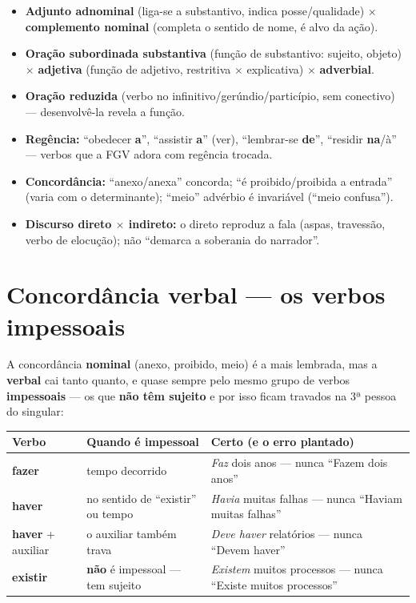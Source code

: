\begin{itemize}
\item \textbf{Adjunto adnominal} (liga-se a substantivo, indica
posse/qualidade) $\times$ \textbf{complemento nominal} (completa o sentido
de nome, é alvo da ação).
\item \textbf{Oração subordinada substantiva} (função de substantivo:
sujeito, objeto) $\times$ \textbf{adjetiva} (função de adjetivo, restritiva
$\times$ explicativa) $\times$ \textbf{adverbial}.
\item \textbf{Oração reduzida} (verbo no infinitivo/gerúndio/particípio, sem
conectivo) --- desenvolvê-la revela a função.
\item \textbf{Regência:} ``obedecer \textbf{a}'', ``assistir \textbf{a}''
(ver), ``lembrar-se \textbf{de}'', ``residir \textbf{na}/à'' --- verbos que a
FGV adora com regência trocada.
\item \textbf{Concordância:} ``anexo/anexa'' concorda; ``é
proibido/proibida a entrada'' (varia com o determinante); ``meio'' advérbio é
invariável (``meio confusa'').
\item \textbf{Discurso direto $\times$ indireto:} o direto reproduz a fala
(aspas, travessão, verbo de elocução); não ``demarca a soberania do
narrador''.
\end{itemize}

\section{Concordância verbal --- os verbos impessoais}

A concordância \textbf{nominal} (anexo, proibido, meio) é a mais lembrada,
mas a \textbf{verbal} cai tanto quanto, e quase sempre pelo mesmo grupo de
verbos \textbf{impessoais} --- os que \textbf{não têm sujeito} e por isso
ficam travados na 3ª pessoa do singular:

\begin{center}
\begin{tabular}{@{}p{3.2cm}p{3.4cm}p{4.4cm}@{}}
\toprule
\textbf{Verbo} & \textbf{Quando é impessoal} & \textbf{Certo (e o erro plantado)} \\
\midrule
\textbf{fazer} & tempo decorrido & \emph{Faz} dois anos --- nunca ``Fazem dois anos'' \\
\textbf{haver} & no sentido de ``existir'' ou tempo & \emph{Havia} muitas falhas --- nunca ``Haviam muitas falhas'' \\
\textbf{haver} + auxiliar & o auxiliar também trava & \emph{Deve haver} relatórios --- nunca ``Devem haver'' \\
\textbf{existir} & \textbf{não} é impessoal --- tem sujeito & \emph{Existem} muitos processos --- nunca ``Existe muitos processos'' \\
\bottomrule
\end{tabular}
\end{center}

